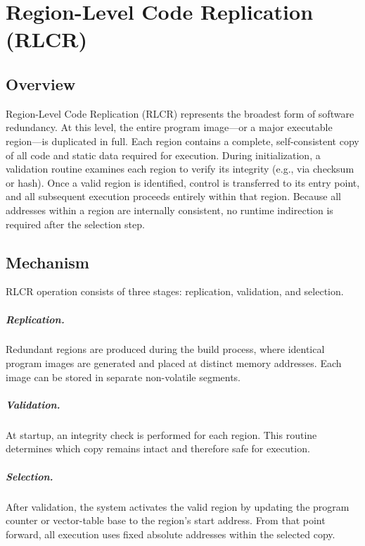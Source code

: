 \chapter{Region-Level Code Replication (RLCR)}
\label{chap:region-level}

\section{Overview}
Region-Level Code Replication (RLCR) represents the broadest form of software redundancy.
At this level, the entire program image---or a major executable region---is duplicated in full.
Each region contains a complete, self-consistent copy of all code and static data required for execution.
During initialization, a validation routine examines each region to verify its integrity (e.g., via checksum or hash).
Once a valid region is identified, control is transferred to its entry point, and all subsequent execution proceeds entirely within that region.
Because all addresses within a region are internally consistent, no runtime indirection is required after the selection step.

\section{Mechanism}
RLCR operation consists of three stages: replication, validation, and selection.

\paragraph{Replication.}
Redundant regions are produced during the build process, where identical program images are generated and placed at distinct memory addresses.
Each image can be stored in separate non-volatile segments.

\paragraph{Validation.}
At startup, an integrity check is performed for each region.
This routine determines which copy remains intact and therefore safe for execution.

\paragraph{Selection.}
After validation, the system activates the valid region by updating the program counter or vector-table base to the region's start address.
From that point forward, all execution uses fixed absolute addresses within the selected copy.

